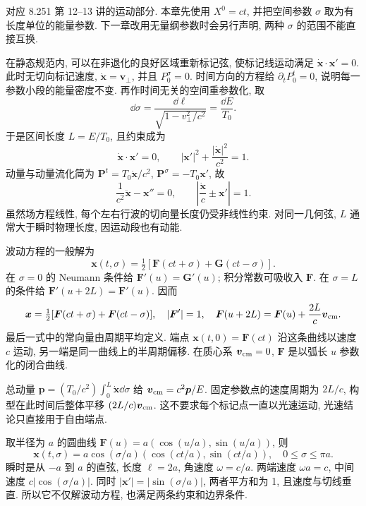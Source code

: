 \label{ch:basic-motion}
对应 8.251 第 12--13 讲的运动部分. 本章先使用 $X^0=ct$, 并把空间参数 $\sigma$ 取为有长度单位的能量参数. 下一章改用无量纲参数时会另行声明, 两种 $\sigma$ 的范围不能直接互换.

在静态规范内, 可以在非退化的良好区域重新标记弦, 使标记线运动满足 $\dot{\boldsymbol x}\cdot\boldsymbol x'=0$. 此时无切向标记速度, $\dot{\boldsymbol x}=\boldsymbol v_\perp$, 并且 $P_0^\sigma=0$. 时间方向的方程给 $\partial_tP_0^t=0$, 说明每一参数小段的能量密度不变. 再作时间无关的空间重参数化, 取
\[
 \dd\sigma=\frac{\dd\ell}{\sqrt{1-v_\perp^2/c^2}}
 =\frac{\dd E}{T_0}.
\]
于是区间长度 $L=E/T_0$, 且约束成为
\[
 \dot{\boldsymbol x}\cdot\boldsymbol x'=0,\qquad
 |\boldsymbol x'|^2+\frac{|\dot{\boldsymbol x}|^2}{c^2}=1.
\]
动量与动量流化简为 $\boldsymbol P^t=T_0\dot{\boldsymbol x}/c^2$,
$\boldsymbol P^\sigma=-T_0\boldsymbol x'$, 故
\[
 \frac1{c^2}\ddot{\boldsymbol x}-\boldsymbol x''=0,
 \qquad\left|\frac{\dot{\boldsymbol x}}c\pm\boldsymbol x'\right|=1.
\]
虽然场方程线性, 每个左右行波的切向量长度仍受非线性约束. 对同一几何弦, $L$ 通常大于瞬时物理长度, 因运动段也有动能.

波动方程的一般解为
\[
 \boldsymbol x(t,\sigma)=\tfrac12
 [\boldsymbol F(ct+\sigma)+\boldsymbol G(ct-\sigma)].
\]
在 $\sigma=0$ 的 Neumann 条件给 $\boldsymbol F'(u)=\boldsymbol G'(u)$; 积分常数可吸收入 $\boldsymbol F$. 在 $\sigma=L$ 的条件给 $\boldsymbol F'(u+2L)=\boldsymbol F'(u)$. 因而
\[
 \boldsymbol x=\tfrac12[\boldsymbol F(ct+\sigma)+\boldsymbol F(ct-\sigma)],
 \quad|\boldsymbol F'|=1,\quad
 \boldsymbol F(u+2L)=\boldsymbol F(u)+\frac{2L}{c}\boldsymbol v_{\rm cm}.
\]
最后一式中的常向量由周期平均定义. 端点 $\boldsymbol x(t,0)=\boldsymbol F(ct)$ 沿这条曲线以速度 $c$ 运动, 另一端是同一曲线上的半周期偏移. 在质心系 $\boldsymbol v_{\rm cm}=0$, $\boldsymbol F$ 是以弧长 $u$ 参数化的闭合曲线.

总动量 $\boldsymbol p=(T_0/c^2)\int_0^L\dot{\boldsymbol x}\dd\sigma$ 给 $\boldsymbol v_{\rm cm}=c^2\boldsymbol p/E$. 固定参数点的速度周期为 $2L/c$, 构型在此时间后整体平移 $(2L/c)\boldsymbol v_{\rm cm}$. 这不要求每个标记点一直以光速运动, 光速结论只直接用于自由端点.

取半径为 $a$ 的圆曲线 $\boldsymbol F(u)=a(\cos(u/a),\sin(u/a))$, 则
\[
 \boldsymbol x(t,\sigma)=a\cos(\sigma/a)
 (\cos(ct/a),\sin(ct/a)),\quad 0\leq\sigma\leq\pi a.
\]
瞬时是从 $-a$ 到 $a$ 的直弦, 长度 $\ell=2a$, 角速度 $\omega=c/a$. 两端速度 $\omega a=c$, 中间速度 $c|\cos(\sigma/a)|$. 同时
$|\boldsymbol x'|=|\sin(\sigma/a)|$, 两者平方和为 1, 且速度与切线垂直. 所以它不仅解波动方程, 也满足两条约束和边界条件.

